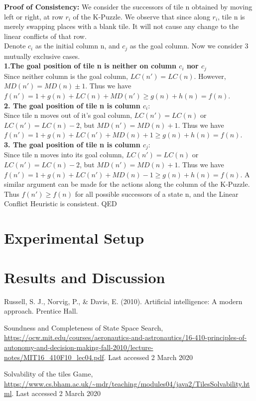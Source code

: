 \documentclass{llncs}
\begin{document}
\textbf{Proof of Consistency:}
We consider the successors of tile n obtained by moving left or right, at row $r_i$ of the K-Puzzle. We observe that since along $r_i$, tile n is merely swapping places with a blank tile. It will not cause any change to the linear conflicts of that row. \\
Denote $c_i$ as the initial column n, and $c_j$ as the goal column. Now we consider 3 mutually exclusive cases. \\
\textbf{1.The goal position of tile n is neither on column $c_i$ nor $c_j$} \\
Since neither column is the goal column, $LC(n') = LC(n)$.
However, $MD(n') = MD(n) \pm 1$. Thus we have $f(n') = 1 + g(n) + LC(n) + MD(n') \geq  g(n) + h(n) = f(n)$. \\
\textbf{2. The goal position of tile n is column $c_i$}: \\
Since tile n moves out of it's goal column, $LC(n') = LC(n)$ or $LC(n') = LC(n) - 2$, but $MD(n') = MD(n) + 1$. Thus we have $f(n') =1 + g(n) + LC(n') + MD(n) + 1 \geq g(n) + h(n) = f(n)$. \\
\textbf{3. The goal position of tile n is column $c_j$}: \\
Since tile n moves into its goal column, $LC(n') = LC(n)$ or $LC(n') = LC(n) - 2$, but $MD(n') = MD(n) + 1$. Thus we have $f(n') = 1 + g(n) + LC(n') + MD(n) - 1 \geq g(n) + h(n) = f(n)$.
A similar argument can be made for the actions along the column of the K-Puzzle.
Thus $f(n') \geq f(n)$ for all possible successors of a state n, and the Linear Conflict Heuristic is consistent. QED

\section{Experimental Setup}
\section{Results and Discussion}
\newpage

\begin{thebibliography}{8}
Russell, S. J., Norvig, P., \& Davis, E. (2010). Artificial intelligence: A modern approach. Prentice Hall.

Soundness and Completeness of State Space Search, \url{https://ocw.mit.edu/courses/aeronautics-and-astronautics/16-410-principles-of-autonomy-and-decision-making-fall-2010/lecture-notes/MIT16\_410F10\_lec04.pdf}. Last accessed 2 March 2020

Solvability of the tiles Game,  \url{https://www.cs.bham.ac.uk/~mdr/teaching/modules04/java2/TilesSolvability.html}. 
Last accessed 2 March 2020
\end{thebibliography}
\newpage
\end{document}
